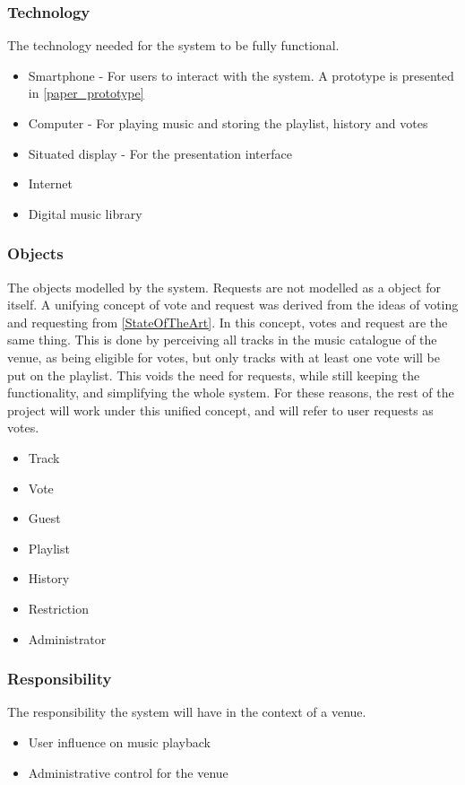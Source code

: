 \subsubsection{Technology}
The technology needed for the system to be fully functional.

\begin{itemize}
    \item Smartphone - For users to interact with the system. A
      prototype is presented in \cref{paper_prototype}
    \item Computer - For playing music and storing the playlist, history and votes
		\item Situated display - For the presentation interface
    \item Internet
    \item Digital music library
\end{itemize}

\subsubsection{Objects}
\label{FACTORObjects}
The objects modelled by the system.
Requests are not modelled as a object for itself. A unifying concept of vote and request was derived from the ideas of voting and requesting from \cref{StateOfTheArt}. In this concept, votes and request are the same thing. This is done by perceiving all tracks in the music catalogue of the venue, as being eligible for votes, but only tracks with at least one vote will be put on the playlist. This voids the need for requests, while still keeping the functionality, and simplifying the whole system. For these reasons, the rest of the project will work under this unified concept, and will refer to user requests as votes.
\begin{itemize}
  \item Track
  \item Vote
  \item Guest
  \item Playlist
  \item History
  \item Restriction
  \item Administrator
\end{itemize}

\subsubsection{Responsibility}
The responsibility the system will have in the context of a venue.
\begin{itemize}
  \item User influence on music playback
  \item Administrative control for the venue
\end{itemize}

